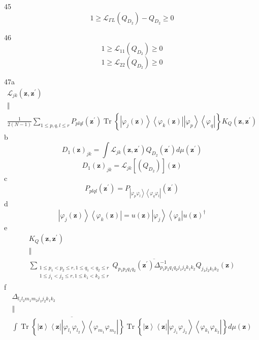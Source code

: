 \documentclass[aps,preprint]{revtex4}%
\begin{document}
45%
\[
1\geq\mathcal{L}_{\Gamma L}\left(  Q_{D_{2}}\right)  -Q_{D_{2}}\geq0
\]


46%
\[
1\geq\mathcal{L}_{11}\left(  Q_{D_{2}}\right)  \geq0
\]%
\[
1\geq\mathcal{L}_{22}\left(  Q_{D_{2}}\right)  \geq0
\]


47a%
\begin{gather*}
\mathcal{L}_{jk}\left(  \mathbf{z,z}^{\prime}\right)  \\
\Vert\\
\frac{1}{2\left(  N-1\right)  }\sum_{1\leq p,q,l\leq r}P_{plql}\left(
\mathbf{z}^{\prime}\right)  \operatorname*{Tr}\left\{  \left\vert \varphi
_{j}\left(  \mathbf{z}\right)  \right\rangle \left\langle \varphi_{k}\left(
\mathbf{z}\right)  \right\vert \overset{}{\left\vert \varphi_{p}\right\rangle
\left\langle \varphi_{q}\right\vert }\right\}  K_{Q}\left(  \mathbf{z,z}%
^{\prime}\right)
\end{gather*}
b%
\[
D_{1}\left(  \mathbf{z}\right)  _{jk}=\int\mathcal{L}_{jk}\left(
\mathbf{z,z}^{\prime}\right)  Q_{D_{2}}\left(  \mathbf{z}^{\prime}\right)
d\mu\left(  \mathbf{z}^{\prime}\right)
\]%
\[
D_{1}\left(  \mathbf{z}\right)  _{jk}=\mathcal{L}_{jk}\left[  \left(
Q_{D_{2}}\right)  \right]  \left(  \mathbf{z}\right)
\]
c%
\[
P_{plql}\left(  \mathbf{z}^{\prime}\right)  =P_{\left\vert \varphi_{p}%
\varphi_{l}\right\rangle \left\langle \varphi_{q}\varphi_{l}\right\vert
}\left(  \mathbf{z}^{\prime}\right)
\]
d%
\[
\left\vert \varphi_{j}\left(  \mathbf{z}\right)  \right\rangle \left\langle
\varphi_{k}\left(  \mathbf{z}\right)  \right\vert =u\left(  \mathbf{z}\right)
\left\vert \varphi_{j}\right\rangle \left\langle \varphi_{k}\right\vert
u\left(  \mathbf{z}\right)  ^{\dagger}%
\]
e%
\begin{gather*}
K_{Q}\left(  \mathbf{z,z}^{\prime}\right)  \\
\Vert\\
\sum_{\substack{1\leq p_{1}<p_{2}\leq r,1\leq q_{1}<q_{2}\leq r\\1\leq
j_{1}<j_{2}\leq r,1\leq k_{1}<k_{2}\leq r}}\overline{Q_{p_{1}p_{2}q_{1}q_{2}%
}\left(  \mathbf{z}^{\prime}\right)  \Delta_{p_{1}p_{2}q_{1}q_{2}j_{1}%
j_{2}k_{1}k_{2}}^{-1}}Q_{j_{1}j_{2}k_{1}k_{2}}\left(  \mathbf{z}\right)
\end{gather*}
f%
\begin{gather*}
\Delta_{l_{1}l_{2}m_{1}m_{2}j_{1}j_{2}k_{1}k_{2}}\\
\Vert\\
\int\overline{\operatorname*{Tr}\left\{  \left\vert \mathbf{z}\right\rangle
\left\langle \mathbf{z}\right\vert \left\vert \varphi_{l_{1}}\varphi_{l_{2}%
}\right\rangle \left\langle \varphi_{m_{1}}\varphi_{m_{2}}\right\vert
\right\}  }\operatorname*{Tr}\left\{  \left\vert \mathbf{z}\right\rangle
\left\langle \mathbf{z}\right\vert \left\vert \varphi_{j_{1}}\varphi_{j_{2}%
}\right\rangle \left\langle \varphi_{k_{1}}\varphi_{k_{2}}\right\vert
\right\}  d\mu\left(  \mathbf{z}\right)
\end{gather*}
\end{document}
